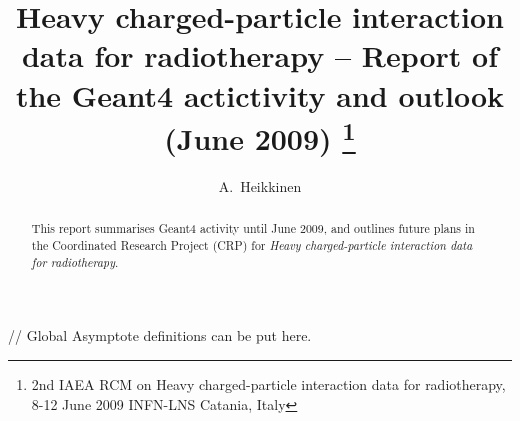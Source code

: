 \documentclass[twoside,floatfix,a4wide]{d}
\numberwithin{equation}{section} %
\begin{document}

// Global Asymptote definitions can be put here.

\title{Heavy charged-particle interaction data for radiotherapy -- 
      Report of the Geant4 actictivity and outlook (June 2009)
\footnote{2nd IAEA RCM on Heavy charged-particle interaction data for radiotherapy, 
                 8-12 June 2009 INFN-LNS Catania, Italy}}

\author{A.~Heikkinen} 


\begin{abstract}
This report summarises Geant4 activity until June 2009, 
and outlines future plans in the Coordinated Research Project (CRP)
for {\em Heavy charged-particle interaction data for radiotherapy}.
\end{abstract}

\maketitle
\thispagestyle{fancy}

\end{document}
